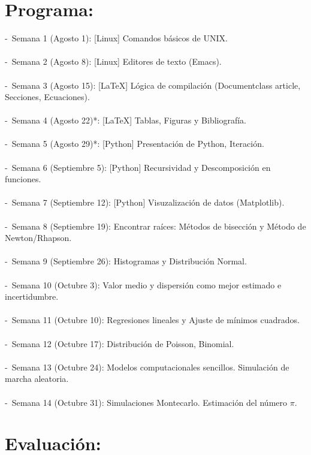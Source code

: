 \documentclass[letterpaper]{article}
\begin{document}
 

\section*{Programa:}
-\ Semana 1 (Agosto 1): [Linux] Comandos b\'asicos de UNIX. \\
\\
-\ Semana 2 (Agosto 8): [Linux] Editores de texto (Emacs). \\
\\
-\ Semana 3 (Agosto 15): [\LaTeX] L\'ogica de compilaci\'on (Documentclass article, Secciones, Ecuaciones).\\
\\
-\ Semana 4 (Agosto 22)*: [\LaTeX] Tablas, Figuras y Bibliograf\'ia. \\
\\
-\ Semana 5 (Agosto 29)*: [Python] Presentaci\'on de Python, Iteraci\'on. \\
\\
-\ Semana 6 (Septiembre 5): [Python] Recursividad y Descomposici\'on en funciones. \\
\\
-\ Semana 7 (Septiembre 12): [Python] Visuzalizaci\'on de datos (Matplotlib). \\
\\
-\ Semana 8 (Septiembre 19): Encontrar ra\'ices: M\'etodos de bisecci\'on y  M\'etodo de \indent Newton/Rhapson. \\
\\
-\ Semana 9 (Septiembre 26): Histogramas y Distribuci\'on Normal. \\
\\
-\ Semana 10 (Octubre 3): Valor medio y dispersi\'on como mejor estimado e incertidumbre. \\
\\
-\ Semana 11 (Octubre 10): Regresiones lineales y Ajuste de m\'inimos cuadrados. \\
\\
-\ Semana 12 (Octubre 17): Distribuci\'on de Poisson, Binomial. \\
\\
-\ Semana 13 (Octubre 24): Modelos computacionales sencillos. Simulaci\'on de marcha aleatoria. \\
\\
-\ Semana 14 (Octubre 31): Simulaciones Montecarlo.  Estimaci\'on del n\'umero $\pi$. \\


\section*{Evaluaci\'on:}
\end{document}
